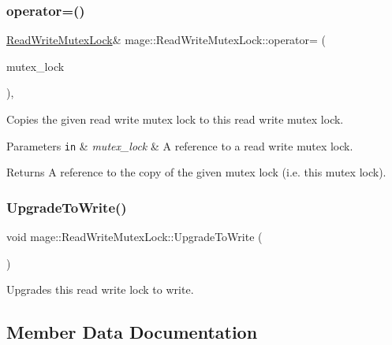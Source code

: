 \subsubsection{\texorpdfstring{operator=()}{operator=()}\hspace{0.1cm}{\footnotesize\ttfamily [2/2]}}
{\footnotesize\ttfamily \hyperlink{structmage_1_1_read_write_mutex_lock}{Read\+Write\+Mutex\+Lock}\& mage\+::\+Read\+Write\+Mutex\+Lock\+::operator= (\begin{DoxyParamCaption}\item[{\hyperlink{structmage_1_1_read_write_mutex_lock}{Read\+Write\+Mutex\+Lock} \&\&}]{mutex\+\_\+lock }\end{DoxyParamCaption})\hspace{0.3cm}{\ttfamily [private]}, {\ttfamily [delete]}}

Copies the given read write mutex lock to this read write mutex lock.


\begin{DoxyParams}[1]{Parameters}
\mbox{\tt in}  & {\em mutex\+\_\+lock} & A reference to a read write mutex lock. \\
\hline
\end{DoxyParams}
\begin{DoxyReturn}{Returns}
A reference to the copy of the given mutex lock (i.\+e. this mutex lock). 
\end{DoxyReturn}
\hypertarget{structmage_1_1_read_write_mutex_lock_a01843784e8dbf0d3dfd6100562f699be}{}\label{structmage_1_1_read_write_mutex_lock_a01843784e8dbf0d3dfd6100562f699be} 
\subsubsection{\texorpdfstring{Upgrade\+To\+Write()}{UpgradeToWrite()}}
{\footnotesize\ttfamily void mage\+::\+Read\+Write\+Mutex\+Lock\+::\+Upgrade\+To\+Write (\begin{DoxyParamCaption}{ }\end{DoxyParamCaption})}

Upgrades this read write lock to write. 

\subsection{Member Data Documentation}
\hypertarget{structmage_1_1_read_write_mutex_lock_a6ee9034fa984e11ec07c20ec77ab1bfe}{}\label{structmage_1_1_read_write_mutex_lock_a6ee9034fa984e11ec07c20ec77ab1bfe} 
